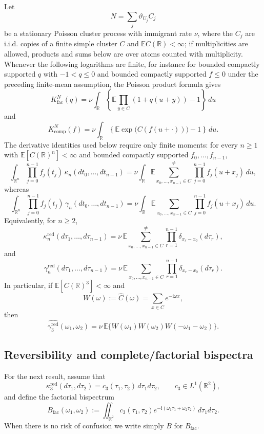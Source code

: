 \documentclass[aap,press]{apt} \volno{00} \partno{00}
\newcommand{\E}{\mathbb{E}}
\newcommand{\R}{\mathbb{R}}
\renewcommand{\ii}{\mathrm{i}}
\newcommand{\1}{\mathbf{1}}
\numberwithin{equation}{section}
\begin{document}
\begin{lem}\label{lem:pcp-cumulant-functional}
Let
\[
N=\sum_j\vartheta_{U_j}C_j
\]
be a stationary Poisson cluster process with immigrant rate $\nu$, where the $C_j$ are i.i.d. copies of a finite simple cluster $C$ and $\E C(\R)<\infty$; if multiplicities are allowed, products and sums below are over atoms counted with multiplicity. Whenever the following logarithms are finite, for instance for bounded compactly supported $q$ with $-1<q\le0$ and bounded compactly supported $f\le0$ under the preceding finite-mean assumption, the Poisson product formula gives
\[
K_{\mathrm{fac}}^N(q)
=
\nu\int_\R
\left\{
\E\prod_{y\in C}(1+q(u+y))-1
\right\}\,du
\]
and
\[
K_{\mathrm{comp}}^N(f)
=
\nu\int_\R
\left\{
\E\exp\big(C(f(u+\cdot))\big)-1
\right\}\,du .
\]
The derivative identities used below require only finite moments: for every $n\ge1$ with $\E[C(\R)^n]<\infty$ and bounded compactly supported $f_0,\ldots,f_{n-1}$,
\[
\int_{\R^n}\prod_{j=0}^{n-1} f_j(t_j)\,
\kappa_n(dt_0,\ldots,dt_{n-1})
=
\nu\int_\R
\E\sum_{x_0,\ldots,x_{n-1}\in C}^{\neq}
\prod_{j=0}^{n-1}f_j(u+x_j)\,du,
\]
whereas
\[
\int_{\R^n}\prod_{j=0}^{n-1} f_j(t_j)\,
\gamma_n(dt_0,\ldots,dt_{n-1})
=
\nu\int_\R
\E\sum_{x_0,\ldots,x_{n-1}\in C}
\prod_{j=0}^{n-1}f_j(u+x_j)\,du.
\]
Equivalently, for $n\ge2$,
\[
\kappa_n^{\mathrm{red}}(d\tau_1,\ldots,d\tau_{n-1})
=
\nu\,\E\sum_{x_0,\ldots,x_{n-1}\in C}^{\neq}
\prod_{r=1}^{n-1}\delta_{x_r-x_0}(d\tau_r),
\]
and
\[
\gamma_n^{\mathrm{red}}(d\tau_1,\ldots,d\tau_{n-1})
=
\nu\,\E\sum_{x_0,\ldots,x_{n-1}\in C}
\prod_{r=1}^{n-1}\delta_{x_r-x_0}(d\tau_r).
\]
In particular, if $\E[C(\R)^3]<\infty$ and
\[
W(\omega):=\widehat C(\omega)=\sum_{x\in C}e^{-\ii\omega x},
\]
then
\[
\widehat{\gamma_3^{\mathrm{red}}}(\omega_1,\omega_2)
=
\nu\,\E\{W(\omega_1)W(\omega_2)W(-\omega_1-\omega_2)\}.
\]
\end{lem}

\subsection{Reversibility and complete/factorial bispectra}

For the next result, assume that
\[
\kappa_3^{\mathrm{red}}(d\tau_1,d\tau_2)=c_3(\tau_1,\tau_2)\,d\tau_1d\tau_2,
\qquad c_3\in L^1(\R^2),
\]
and define the factorial bispectrum
\[
B_{\mathrm{fac}}(\omega_1,\omega_2)
:=
\iint_{\R^2} c_3(\tau_1,\tau_2)e^{-\ii(\omega_1\tau_1+\omega_2\tau_2)}\,d\tau_1d\tau_2.
\]
When there is no risk of confusion we write simply $B$ for $B_{\mathrm{fac}}$.
\end{document}
